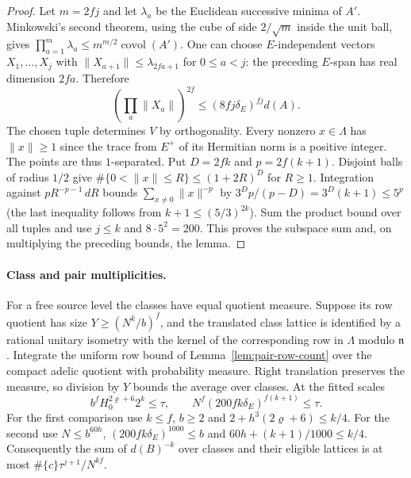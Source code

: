 \begin{proof}
Let $m=2fj$ and let $\lambda_a$ be the Euclidean successive minima of
$A'$. Minkowski's second theorem, using the cube of side $2/\sqrt m$
inside the unit ball, gives $\prod_{a=1}^m\lambda_a\le
m^{m/2}\operatorname{covol}(A')$. One can choose $E$-independent vectors
$X_1,\ldots,X_j$ with $\|X_{a+1}\|\le\lambda_{2fa+1}$ for $0\le a<j$:
the preceding $E$-span has real dimension $2fa$. Therefore
\[
 (\prod_a \|X_a\|)^{2f}\le (8fj\delta_E)^{fj}d(A).
\]
The chosen tuple determines $V$ by orthogonality. Every nonzero
$x\in\Lambda$ has $\|x\|\ge1$ since the trace from $E^+$ of its Hermitian
norm is a positive integer. The points are thus $1$-separated. Put
$D=2fk$ and $p=2f(k+1)$. Disjoint balls of radius $1/2$ give
$\#\{0<\|x\|\le R\}\le(1+2R)^D$ for $R\ge1$.
Integration against $pR^{-p-1}\,dR$ bounds $\sum_{x\ne0}\|x\|^{-p}$
by $3^D p/(p-D)=3^D(k+1)\le5^p$
(the last inequality follows from $k+1\le(5/3)^{2k}$).
Sum the product bound over all tuples and use $j\le k$ and
$8\cdot5^2=200$. This proves the subspace sum and, on multiplying
the preceding bounds, the lemma.
\end{proof}

\paragraph{Class and pair multiplicities.}
For a free source level the classes have equal quotient measure.
Suppose its row quotient has size $Y\ge(N^k/b)^f$, and the translated
class lattice is identified by a rational unitary isometry with the
kernel of the corresponding row in $\Lambda$ modulo $\mathfrak n$.
Integrate the uniform row bound of Lemma~\ref{lem:pair-row-count}
over the compact adelic quotient with probability measure. Right
translation preserves the measure, so division by $Y$ bounds the
average over classes. At the fitted scales
\[
 b^f H_0^{2\varrho+6}2^k\le\tau,\qquad
 N^f(200fk\delta_E)^{f(k+1)}\le\tau .
\]
For the first comparison use $k\le f$, $b\ge2$ and
$2+h^3(2\varrho+6)\le k/4$. For the second use $N\le b^{60h}$,
$(200fk\delta_E)^{1000}\le b$ and $60h+(k+1)/1000\le k/4$.
Consequently the sum of $d(B)^{-k}$ over classes and their eligible
lattices is at most $\#\{c\}\tau^{j+1}/N^{kf}$.

